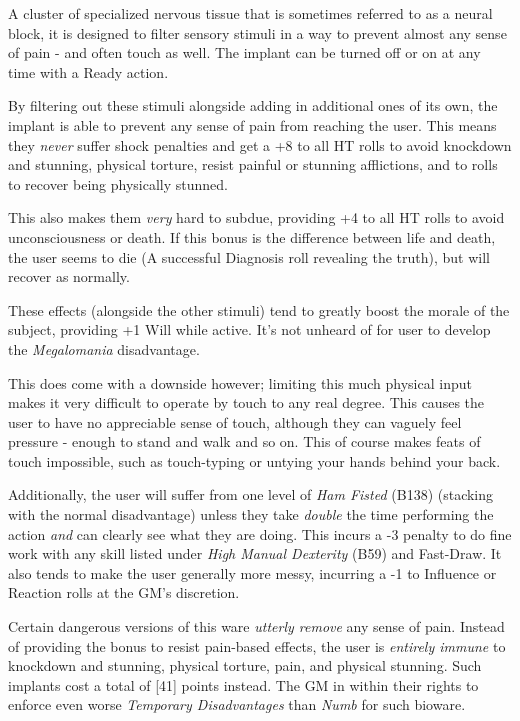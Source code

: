 \begin{multicols*}{3}
	A cluster of specialized nervous tissue that is sometimes referred to as a neural block, it is designed to filter sensory stimuli in a way to prevent almost any sense of pain - and often touch as well. The implant can be turned off or on at any time with a Ready action.
	
	By filtering out these stimuli alongside adding in additional ones of its own, the implant is able to prevent any sense of pain from reaching the user. This means they \textit{never} suffer shock penalties and get a +8 to all HT rolls to avoid knockdown and stunning, physical torture, resist painful or stunning afflictions, and to rolls to recover being physically stunned. 
	
	This also makes them \textit{very} hard to subdue, providing +4 to all HT rolls to avoid unconsciousness or death. If this bonus is the difference between life and death, the user seems to die (A successful Diagnosis roll revealing the truth), but will recover as normally.
	
	These effects (alongside the other stimuli) tend to greatly boost the morale of the subject, providing +1 Will while active. It's not unheard of for user to develop the \textit{Megalomania} disadvantage.
	
	This does come with a downside however; limiting this much physical input makes it very difficult to operate by touch to any real degree. This causes the user to have no appreciable sense of touch, although they can vaguely feel pressure - enough to stand and walk and so on. This of course makes feats of touch impossible, such as touch-typing or untying your hands behind your back. 
	
	Additionally, the user will suffer from one level of \textit{Ham Fisted} (B138) (stacking with the normal disadvantage) unless they take \textit{double} the time performing the action \textit{and} can clearly see what they are doing. This incurs a -3 penalty to do fine work with any skill listed under \textit{High Manual Dexterity} (B59) and Fast-Draw. It also tends to make the user generally more messy, incurring a -1 to Influence or Reaction rolls at the GM's discretion.
	
	Certain dangerous versions of this ware \textit{utterly remove} any sense of pain. Instead of providing the bonus to resist pain-based effects, the user is \textit{entirely immune} to knockdown and stunning, physical torture, pain, and physical stunning. Such implants cost a total of [41] points instead. The GM in within their rights to enforce even worse \textit{Temporary Disadvantages} than \textit{Numb} for such bioware.


\end{multicols*}
